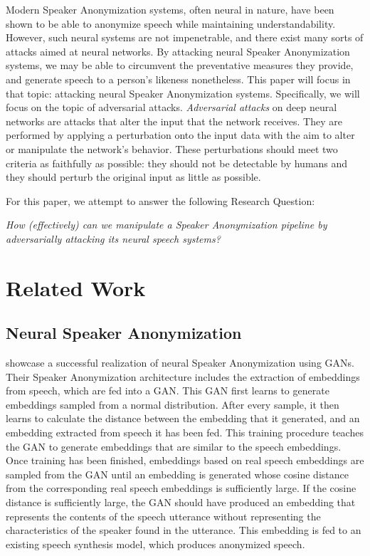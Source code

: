 \documentclass[11pt]{article}
\begin{document}
Modern Speaker Anonymization systems, often neural in nature, have been shown to be able to anonymize speech while maintaining understandability.
However, such neural systems are not impenetrable, and there exist many sorts of attacks aimed at neural networks.
By attacking neural Speaker Anonymization systems, we may be able to circumvent the preventative measures they provide, and generate speech to a person's likeness nonetheless.
This paper will focus in that topic: attacking neural Speaker Anonymization systems.
Specifically, we will focus on the topic of adversarial attacks.
\textit{Adversarial attacks} on deep neural networks are attacks that alter the input that the network receives.
They are performed by applying a perturbation onto the input data with the aim to alter or manipulate the network's behavior.
These perturbations should meet two criteria as faithfully as possible: they should not be detectable by humans and they should perturb the original input as little as possible.

For this paper, we attempt to answer the following Research Question:
\begin{displayquote}
  \textit{How (effectively) can we manipulate a Speaker Anonymization pipeline by adversarially attacking its neural speech systems?}
\end{displayquote}

\section{Related Work}
\subsection{Neural Speaker Anonymization}
\citet{meyer2023anonymizing} showcase a successful realization of neural Speaker Anonymization using GANs.
Their Speaker Anonymization architecture includes the extraction of embeddings from speech, which are fed into a GAN.
This GAN first learns to generate embeddings sampled from a normal distribution.
After every sample, it then learns to calculate the distance between the embedding that it generated, and an embedding extracted from speech it has been fed.
This training procedure teaches the GAN to generate embeddings that are similar to the speech embeddings.
Once training has been finished, embeddings based on real speech embeddings are sampled from the GAN until an embedding is generated whose cosine distance from the corresponding real speech embeddings is sufficiently large.
If the cosine distance is sufficiently large, the GAN should have produced an embedding that represents the contents of the speech utterance without representing the characteristics of the speaker found in the utterance.
This embedding is fed to an existing speech synthesis model, which produces anonymized speech.
\end{document}

